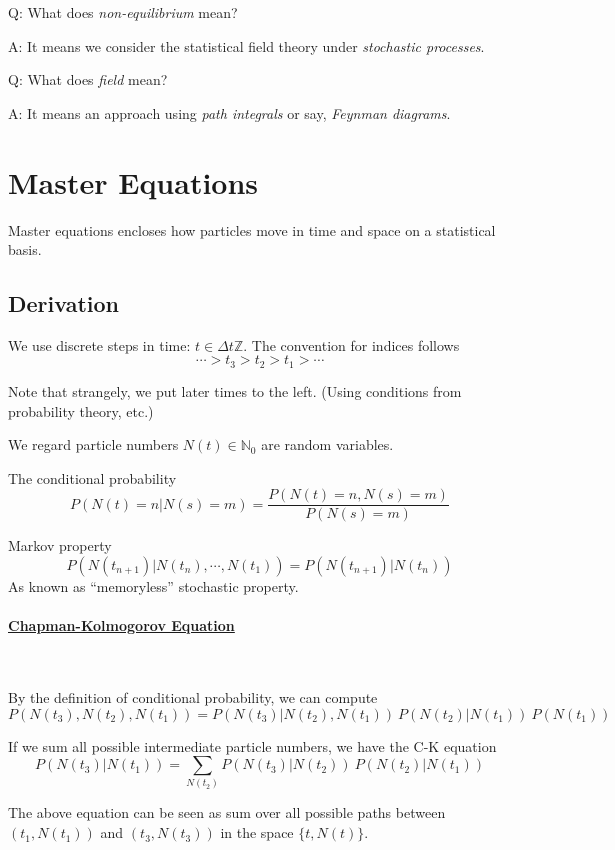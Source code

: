 \documentclass[a4paper,11pt]{article}
\begin{document}
	Q: What does \emph{non-equilibrium} mean? 
	
	A: It means we consider the statistical field theory under \emph{stochastic processes}.

	Q: What does \emph{field} mean? 
	
	A: It means an approach using \emph{path integrals} or say, \emph{Feynman diagrams}.
	\newpage
	\tableofcontents
	\newpage
	\maintext

	\section{Master Equations}
	Master equations encloses how particles move in time and space on a statistical basis.

	\subsection{Derivation}

	We use discrete steps in time: $t \in \Delta t \mathbb{Z}$. The convention for indices follows 
	$$\cdots > t_3 > t_2 > t_1 > \cdots$$

	Note that strangely, we put later times to the left. (Using conditions from probability theory, etc.)

	We regard particle numbers $N(t) \in \mathbb{N}_0$ are random variables.

	The conditional probability
	\[
		P\left(N(t) = n | N(s) = m\right) = \frac{P\left(N(t) = n , N(s) = m\right)}{P\left(N(s) = m\right)}
	\]
	
	Markov property
	\[
		P(N(t_{n+1})| N(t_n), \cdots, N(t_1)) = P(N(t_{n+1})|N(t_n))
	\]
	As known as ``memoryless'' stochastic property.

	\paragraph{\underline{Chapman-Kolmogorov Equation}} 
	\ 

	By the definition of conditional probability, we can compute
	\[
		P(N(t_3), N(t_2), N(t_1)) = P(N(t_3)| N(t_2), N(t_1))\ P(N(t_2)|N(t_1))\ P(N(t_1))
	\]
	
	If we sum all possible intermediate particle numbers, we have the C-K equation
	\begin{equation}
		\boxed{P(N(t_3)| N(t_1)) = \sum_{N(t_2)} P(N(t_3)|N(t_2))\ P(N(t_2)|N(t_1))}
	\end{equation}
	
	The above equation can be seen as sum over all possible paths between $(t_1, N(t_1))$ and $(t_3, N(t_3))$ in the space $\{t, N(t)\}$.
\end{document}
